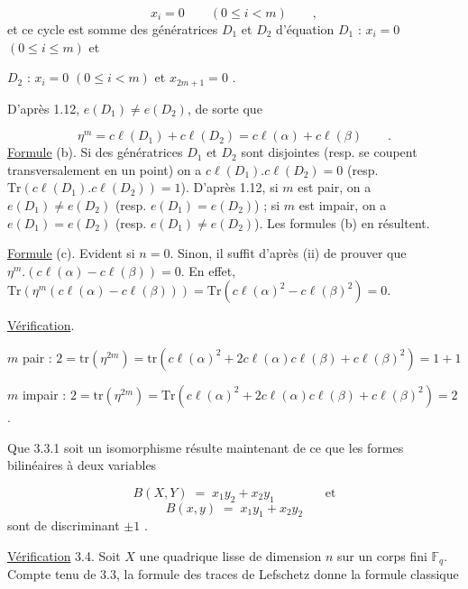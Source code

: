 \begin{equation*}
x_{i} = 0 \qquad (0 \leqslant i < m) \qquad ,
\end{equation*}
et ce cycle est somme des génératrices $D_{1}$ et $D_{2}$ d'équation
$D_{1}$ : $x_{i} = 0$ $(0 \leqslant i \leqslant m)$ \quad et

$D_{2}$ : $x_{i} = 0$ $(0 \leqslant i < m)$ et $x_{2m+1} = 0$ .

D'après 1.12, $e(D_{1}) \neq e(D_{2})$, de sorte que

\begin{equation*}
\eta^{m} = c\ell(D_{1}) + c\ell(D_{2}) = c\ell(\alpha) + c\ell(\beta) \qquad .
\end{equation*}
\underline{Formule} (b). Si des génératrices $D_{1}$ et $D_{2}$ sont disjointes (resp. se coupent transversalement en un point) on a $c\ell(D_{1}).c\ell(D_{2}) = 0$ (resp. $\mathrm{Tr}(c\ell(D_{1}).c\ell(D_{2})) = 1$). D'après 1.12, si $m$ est pair, on a $e(D_{1}) \neq e(D_{2})$ (resp. $e(D_{1}) = e(D_{2})$) ; si $m$ est impair, on a $e(D_{1}) = e(D_{2})$ (resp. $e(D_{1}) \neq e(D_{2})$). Les formules (b) en résultent.

\underline{Formule} (c). Evident si $n = 0$. Sinon, il suffit d'après (ii) de prouver que $\eta^{m}.(c\ell(\alpha)-c\ell(\beta)) = 0$. En effet, $\mathrm{Tr}(\eta^{m}(c\ell(\alpha)-c\ell(\beta))) = \mathrm{Tr}(c\ell(\alpha)^{2}-c\ell(\beta)^{2})=0$.

\underline{Vérification}.

$m$ pair : $2 = \mathrm{tr}(\eta^{2m}) = \mathrm{tr}(c\ell(\alpha)^{2}+ 2c\ell(\alpha)c\ell(\beta) + c\ell(\beta)^{2}) = 1 + 1$

$m$ impair : $2 = \mathrm{tr}(\eta^{2m}) = \mathrm{Tr}(c\ell(\alpha)^{2} + 2c\ell(\alpha)c\ell(\beta) + c\ell(\beta)^{2}) = 2$ .

Que 3.3.1 soit un isomorphisme résulte maintenant de ce que les formes bilinéaires à deux variables

\begin{equation*}
B(X,Y) \; = \; x_{1}y_{2} + x_{2}y_{1} \qquad\qquad \mathrm{et}
\end{equation*}
\begin{equation*}
B(x,y) \; = \; x_{1}y_{1} + x_{2}y_{2}
\end{equation*}
sont de discriminant $\pm 1$ .



\underline{Vérification} 3.4. Soit $X$ une quadrique lisse de dimension $n$ sur un corps fini $\mathbb{F}_q$. Compte tenu de 3.3, la formule des traces de Lefschetz donne la formule classique

